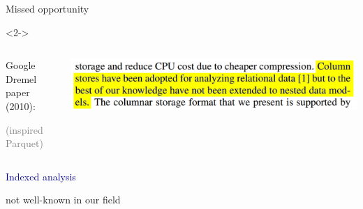 \documentclass[aspectratio=169]{beamer}
\begin{document}
\begin{frame}{Missed opportunity}
\begin{center}
\end{center}
\begin{uncoverenv}<2->
\begin{columns}
\begin{center}
\small
{\Large Google Dremel paper (2010):}

\textcolor{gray}{(inspired Parquet)}
\end{center}

\includegraphics[width=\linewidth]{dremel-paper-cropped.png}
\end{columns}
\end{uncoverenv}
\end{frame}

\begin{frame}{}
\huge
\vspace{0.5 cm}
\begin{center}
\textcolor{darkblue}{Indexed analysis}

\large
\vspace{0.5 cm}
not well-known in our field
\end{center}
\end{frame}
\end{document}

